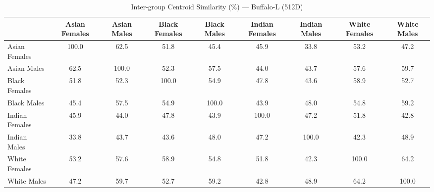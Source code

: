 \begin{table}[htbp]
\centering
\caption{Inter-group Centroid Similarity (\%) — Buffalo-L (512D)}
\label{tab:inter-if-buffalo-l}
\tiny
\begin{tabular}{lcccccccc}
\toprule
 & Asian Females & Asian Males & Black Females & Black Males & Indian Females & Indian Males & White Females & White Males \\
\midrule
Asian Females & 100.0 & 62.5 & 51.8 & 45.4 & 45.9 & 33.8 & 53.2 & 47.2 \\
Asian Males & 62.5 & 100.0 & 52.3 & 57.5 & 44.0 & 43.7 & 57.6 & 59.7 \\
Black Females & 51.8 & 52.3 & 100.0 & 54.9 & 47.8 & 43.6 & 58.9 & 52.7 \\
Black Males & 45.4 & 57.5 & 54.9 & 100.0 & 43.9 & 48.0 & 54.8 & 59.2 \\
Indian Females & 45.9 & 44.0 & 47.8 & 43.9 & 100.0 & 47.2 & 51.8 & 42.8 \\
Indian Males & 33.8 & 43.7 & 43.6 & 48.0 & 47.2 & 100.0 & 42.3 & 48.9 \\
White Females & 53.2 & 57.6 & 58.9 & 54.8 & 51.8 & 42.3 & 100.0 & 64.2 \\
White Males & 47.2 & 59.7 & 52.7 & 59.2 & 42.8 & 48.9 & 64.2 & 100.0 \\
\bottomrule
\end{tabular}
\end{table}
